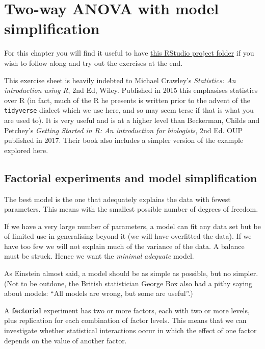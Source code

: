 \documentclass[
  letterpaper,
  DIV=11,
  numbers=noendperiod]{scrreprt}
\begin{document}
\chapter{Two-way ANOVA with model
simplification}\label{two-way-anova-with-model-simplification}

For this chapter you will find it useful to have
\href{https://github.com/mbh038/ANOVA-two-way-with-model-simplification/archive/refs/heads/main.zip}{this
RStudio project folder} if you wish to follow along and try out the
exercises at the end.

This exercise sheet is heavily indebted to Michael Crawley's
\emph{Statistics: An introduction using R}, 2nd Ed, Wiley. Published in
2015 this emphasises statistics over R (in fact, much of the R he
presents is written prior to the advent of the \texttt{tidyverse}
dialect which we use here, and so may seem terse if that is what you are
used to). It is very useful and is at a higher level than Beckerman,
Childs and Petchey's \emph{Getting Started in R: An introduction for
biologists}, 2nd Ed. OUP published in 2017. Their book also includes a
simpler version of the example explored here.

\section{Factorial experiments and model
simplification}\label{factorial-experiments-and-model-simplification}

The best model is the one that adequately explains the data with fewest
parameters. This means with the smallest possible number of degrees of
freedom.

If we have a very large number of parameters, a model can fit any data
set but be of limited use in generalising beyond it (we will have
overfitted the data). If we have too few we will not explain much of the
variance of the data. A balance must be struck. Hence we want the
\emph{minimal} \emph{adequate} model.

As Einstein almost said, a model should be as simple as possible, but no
simpler. (Not to be outdone, the British statistician George Box also
had a pithy saying about models: ``All models are wrong, but some are
useful''.)

A \textbf{factorial} experiment has two or more factors, each with two
or more levels, plus replication for each combination of factor levels.
This means that we can investigate whether statistical interactions
occur in which the effect of one factor depends on the value of another
factor.
\end{document}
